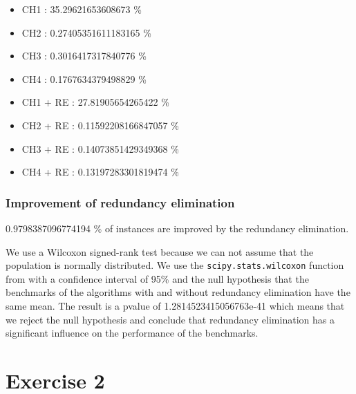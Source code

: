 \documentclass[a4paper,12pt]{article}
\begin{document}
\begin{itemize}
    \item CH1 : 35.29621653608673 \%
    \item CH2 : 0.27405351611183165 \%
    \item CH3 : 0.3016417317840776 \%
    \item CH4 : 0.1767634379498829 \%
    \item CH1 + RE : 27.81905654265422 \%
    \item CH2 + RE : 0.11592208166847057 \%
    \item CH3 + RE : 0.14073851429349368 \%
    \item CH4 + RE : 0.13197283301819474 \%
\end{itemize}

\subsubsection{Improvement of redundancy elimination}

0.9798387096774194 \% of instances are improved by the redundancy elimination.

We use a Wilcoxon signed-rank test because we can not assume that the population is normally distributed. We use the \texttt{scipy.stats.wilcoxon} function from \cite{scipywilcoxon} with a confidence interval of 95\% and the null hypothesis that the benchmarks of the algorithms with and without redundancy elimination have the same mean.
The result is a pvalue of 1.2814523415056763e-41 which means that we reject the null hypothesis and conclude that redundancy elimination has a significant influence on the performance of the benchmarks.

\section{Exercise 2}


\end{document}
